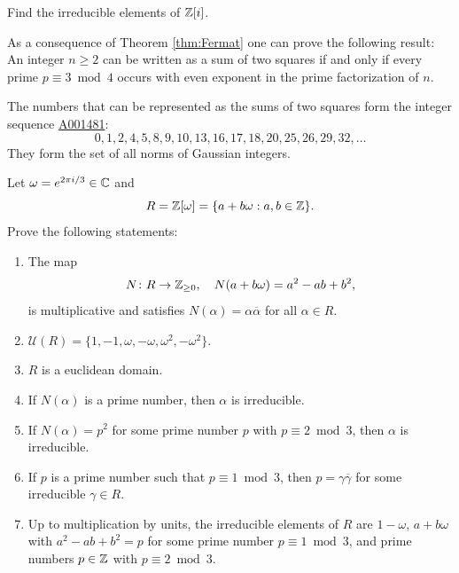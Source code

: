 \begin{exercise}
\label{xca:Z[i]irreducibles}
Find the irreducible elements of $\mathbb{Z}[i]$. 
\end{exercise}

As a consequence of Theorem \ref{thm:Fermat} one can prove the following
result: An integer $n\geq2$ can be written as a sum of two squares
if and only if every prime $p\equiv3\bmod4$ occurs with even
exponent in the prime factorization of $n$.

\begin{optional}
The numbers that can be represented as the sums of two squares form the integer sequence \href{https://oeis.org/A001481}{A001481}: 
\[
0, 1, 2, 4, 5, 8, 9, 10, 13, 16, 17, 18, 20, 25, 26, 29, 32,\dots 
\] 
They form the set of all norms of Gaussian integers. 
\end{optional}

\begin{bonus}
    \label{xca:Eisenstein}
    Let $\omega=e^{2\pi i/3}\in\mathbb{C}$ and 
    \[
    R=\mathbb{Z}[\omega]=\{a+b\omega:a,b\in\mathbb{Z}\}.
    \]
    Prove the following statements:
    \begin{enumerate}
        \item The map 
        \[
        N\colon R\to\mathbb{Z}_{\geq0},
        \quad
        N(a+b\omega)=a^2-ab+b^2,
        \]
        is multiplicative and 
        satisfies $N(\alpha)=\alpha\overline{\alpha}$
        for all $\alpha\in R$. 
        \item $\mathcal{U}(R)=\{1,-1,\omega,-\omega,\omega^2,-\omega^2\}$.
        \item $R$ is a euclidean domain.
        \item If $N(\alpha)$ is a prime number, then $\alpha$ is irreducible. 
        \item If $N(\alpha)=p^2$ for some 
            prime number $p$ with $p\equiv 2\bmod 3$, then 
            $\alpha$ is irreducible. 
        \item If $p$ is a prime number such that $p\equiv 1\bmod 3$, then 
            $p=\gamma\overline{\gamma}$ for some 
            irreducible $\gamma\in R$.
        \item Up to multiplication by units, 
            the irreducible elements of $R$ are $1-\omega$, 
            $a+b\omega$ with $a^2-ab+b^2=p$ for some prime number 
            $p\equiv 1\bmod 3$, 
            and prime numbers $p\in\mathbb{Z}$ with $p\equiv 2\bmod 3$.
    \end{enumerate}
\end{bonus}


